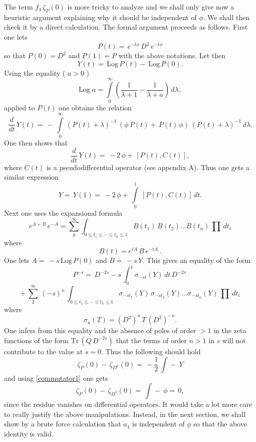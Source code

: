 \documentclass[12pt]{article}%
\begin{document}
The term $f_{4}\,\zeta_{P}(0)$ is more tricky to analyze and we shall only
give now a heuristic argument explaining why it should be independent of
$\phi$. We shall then check it by a direct calculation. The formal argument
proceeds as follows. First one lets
\[
P(t)=\,e^{-t\phi}\,D^{2}\,e^{-t\phi}%
\]
so that $P(0)=D^{2}$ and $P(1)=P$ with the above notations. Let then
\[
Y(t)=\,\mathrm{Log}\,P(t)-\,\mathrm{Log}\,P(0).
\]
Using the equality ( $a>0$ )%
\[
\mathrm{Log\;}a=%
{\displaystyle\int\limits_{0}^{\infty}}
\left(  \frac{1}{\lambda+1}-\frac{1}{\lambda+a}\right)  \,d\lambda,
\]
applied to $P(t)$ one obtains the relation
\begin{equation}
\frac{d}{dt}\,Y(t)=\,-\,{\displaystyle\int\limits_{0}^{\infty}}\,(P(t)+\lambda
)^{-1}\,(\phi\,P(t)+\,P(t)\,\phi)\,(P(t)+\lambda)^{-1}\,d\lambda. \label{derY}%
\end{equation}
One then shows that
\begin{equation}
\frac{d}{dt}\,Y(t)=\,-2\,\phi+\,[P(t),C(t)], \label{commutator}%
\end{equation}
where $C(t)$ is a pseudodifferential operator (see appendix A). Thus one gets
a similar expression
\begin{equation}
Y=\,Y(1)=\,-2\,\phi+\,{\displaystyle\int\limits_{0}^{1}}\,[P(t),C(t)]\,dt.
\label{commutator1}%
\end{equation}
Next one uses the expansional formula
\[
e^{A+B}\,e^{-A}=\sum_{0}^{\infty}\int_{0\leq t_{1}\leq\cdots\leq t_{n}\leq
1}B(t_{1})\,B(t_{2})\ldots B(t_{n})\,\prod\,dt_{i}%
\]
where
\[
B(t)=e^{tA}\,B\,e^{-tA}\,.
\]
One lets $A=\,-s\,\mathrm{Log}\,P(0)$ and $B=\,-s\,Y$. This gives an equality
of the form
\[
P^{-s}=\,D^{-2s}-s\,\int_{0}^{1}\sigma_{-st}(Y)\,dt\,D^{-2s}\,
\]%
\[
+\,\sum_{2}^{\infty}\,(-s)^{n}\,\int_{0\leq t_{1}\leq\cdots\leq t_{n}\leq
1}\sigma_{-st_{1}}(Y)\,\sigma_{-st_{2}}(Y)\ldots\sigma_{-st_{n}}%
(Y)\,\prod\,dt_{i}%
\]
where
\[
\sigma_{u}(T)=(D^{2})^{u}\,T\,(D^{2})^{-u}.
\]
One infers from this equality and the absence of poles of order $>1$ in the
zeta functions of the form $\mathrm{Tr}\,(Q\,D^{-2s})$ that the terms of order
$n>1$ in $s$ will not contribute to the value at $s=0$. Thus the following
should hold
\[
\zeta_{P}(0)-\,\zeta_{D^{2}}(0)=\,-\frac{1}{2}\,\int\!\!\!\!\!\!-\ Y
\]
and using \eqref{commutator1} one gets
\[
\zeta_{P}(0)-\,\zeta_{D^{2}}(0)=\,\int\!\!\!\!\!\!-\ \phi=\,0,
\]
since the residue vanishes on differential operators. It would take a lot more
care to really justify the above manipulations. Instead, in the next section,
we shall show by a brute force calculation that $a_{4}$ is independent of
$\phi$ so that the above identity is valid.
\end{document}
